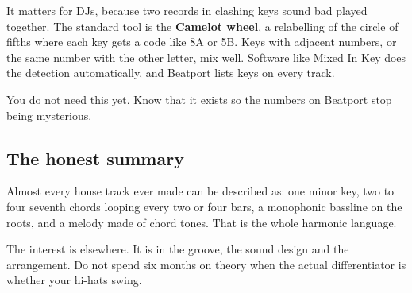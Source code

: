It matters for DJs, because two records in clashing keys sound bad played together. The
standard tool is the \textbf{Camelot wheel}, a relabelling of the circle of fifths where each key
gets a code like 8A or 5B. Keys with adjacent numbers, or the same number with the other
letter, mix well. Software like Mixed In Key does the detection automatically, and Beatport
lists keys on every track.

You do not need this yet. Know that it exists so the numbers on Beatport stop being
mysterious.

\subsection{The honest summary}\label{th04_harmony-the-honest-summary}

Almost every house track ever made can be described as: one minor key, two to four seventh
chords looping every two or four bars, a monophonic bassline on the roots, and a melody made
of chord tones. That is the whole harmonic language.

The interest is elsewhere. It is in the groove, the sound design and the arrangement. Do not
spend six months on theory when the actual differentiator is whether your hi-hats swing.
